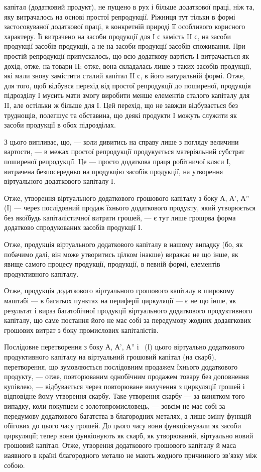 \parcont{}  %
капітал (додатковий продукт), не пущено в рух і більше додаткової праці,
ніж та, яку витрачалось на основі простої репродукції. Ріжниця тут
тільки в формі застосовуваної додаткової праці, в конкретній природі її
особливого корисного характеру. Її витрачено на засоби продукції для
І с замість II с, на засоби продукції засобів продукції, а не на засоби
продукції засобів споживання. При простій репродукції припускалось,
що всю додаткову вартість І витрачається як дохід, отже, на товари II;
отже, вона складалась лише з таких засобів продукції, які мали знову
замістити сталий капітал II с, в його натуральній формі. Отже, для того,
щоб відбувся перехід від простої репродукції до поширеної, продукція підрозділу
І мусить мати змогу виробити менше елементів сталого капіталу
для II, але остільки ж більше для І. Цей перехід, що не завжди відбувається
без труднощів, полегшує та обставина, що деякі продукти І
можуть служити як засоби продукції в обох підрозділах.

З цього випливає, що, — коли дивитись на справу лише з погляду величини
вартости, — в межах простої репродукції продукується матеріяльний
субстрат поширеної репродукції. Це — просто додаткова праця робітничої
кляси І, витрачена безпосередньо на продукцію засобів продукції, на утворення
віртуального додаткового капіталу І.

Отже, утворення віртуального додаткового грошового капіталу з боку
А, А', А'' (І) — через послідовний продаж їхнього додаткового продукту,
який утворюється без якоїбудь капіталістичної витрати грошей, — є тут
лише грошрва форма додатково спродукованих засобів продукції І.

Отже, продукція віртуального додаткового капіталу в нашому випадку
(бо, як побачимо далі, він може утворитись цілком інакше) виражає не
що інше, як явище самого процесу продукції, продукції, в певній формі,
елементів продуктивного капіталу.

Отже, продукція додаткового віртуального грошового капіталу в широкому
маштабі — в багатьох пунктах на периферії циркуляції — є не що
інше, як результат і вираз багатобічної продукції віртуального додаткового
продуктивного капіталу, що саме постання його не має собі за передумову
жодних додаягкових грошових витрат з боку промислових капіталістів.

Послідовне перетворення з боку А, А', А'' і~ (І) цього віртуально
додаткового продуктивного капіталу на віртуальний грошовий
капітал (на скарб), перетворення, що зумовлюється послідовним продажем
їхнього додаткового продукту, — отже, повторюваним однобічним продажем
товару без доповнення купівлею, — відбувається через повторюване
вилучення з циркуляції грошей і відповідне йому утворення скарбу. Таке
утворення скарбу — за винятком того випадку, коли покупцем є золотопромисловець,
— зовсім не має собі за передумову додаткового багатства
в благородних металях, а лише зміну функцій обігових до цього часу
грошей. До цього часу вони функціонували як засоби циркуляції; тепер
вони функіонують як скарб, як утворюваний, віртуально новий грошовий
капітал. Отже, утворення додаткового грошового капіталу й маса
иаявного в країні благородного металю не мають жодного причинного
зв'язку між собою.
